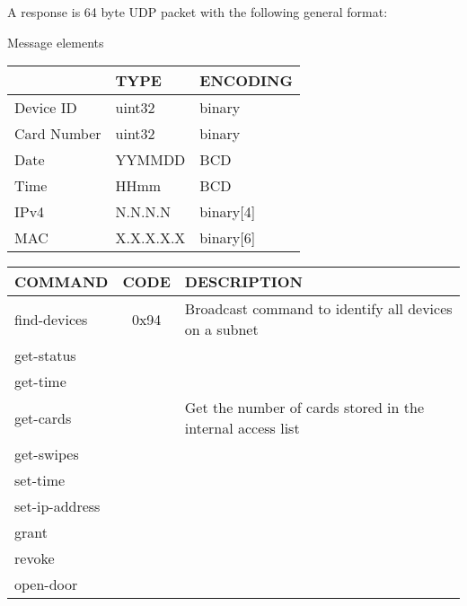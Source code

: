 \documentclass[11pt, oneside]{article}
\begin{document}
A response is 64 byte UDP packet with the following general format:

{ 
}

Message elements

{ \begin{tabular}{ | l | l | l | }
   \hline
   & TYPE & ENCODING \\ 
   \hline
   Device ID & uint32 & binary \\ 
   \hline
   Card Number & uint32 & binary \\ 
   \hline
   Date & YYMMDD & BCD \\ 
   \hline
   Time & HHmm & BCD \\ 
   \hline
   IPv4  & N.N.N.N & binary[4] \\ 
   \hline
   MAC  & X.X.X.X.X & binary[6] \\ 
   \hline
   \end{tabular}
   \vspace{0.5cm}
}


{ \begin{tabular}{ | l | c | l | }
   \hline
   COMMAND & CODE & DESCRIPTION \\ 
   \hline
   find-devices & 0x94 &  Broadcast command to identify all devices on a subnet \\ 
   \hline
   get-status &  &  \\ 
   \hline
   get-time &  &  \\ 
   \hline
   get-cards &  &  Get the number of cards stored in the internal access list \\ 
   \hline
   get-swipes &  &  \\
   \hline
   set-time &  &  \\
   \hline
   set-ip-address &  &  \\
   \hline
   grant &  &  \\
   \hline
   revoke &  &  \\ 
   \hline
   open-door &  &  \\ 
   \hline
   \end{tabular}
   \vspace{0.5cm}
}
\end{document}
